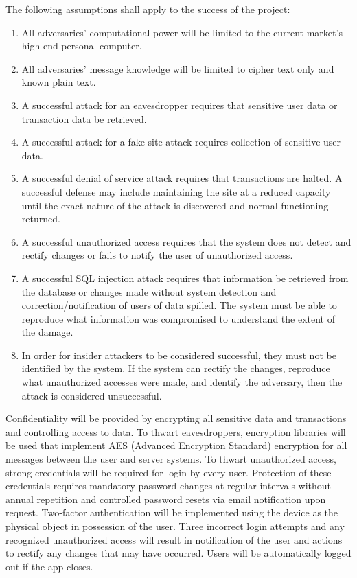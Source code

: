 \documentclass[12pt]{article}
\begin{document}
The following assumptions shall apply to the success of the project:
\begin{enumerate}
\item All adversaries' computational power will be limited to the current market's high end personal computer.
\item All adversaries' message knowledge will be limited to cipher text only and known plain text.
\item A successful attack for an eavesdropper requires that sensitive user data or transaction data be retrieved. 
\item A successful attack for a fake site attack requires collection of sensitive user data.
\item A successful denial of service attack requires that transactions are halted.  A successful defense may include maintaining the site at a reduced capacity until the exact nature of the attack is discovered and normal functioning returned.
\item A successful unauthorized access requires that the system does not detect and rectify changes or fails to notify the user of unauthorized access.
\item A successful SQL injection attack requires that information be retrieved from the database or changes made without system detection and correction/notification of users of data spilled.  The system must be able to reproduce what information was compromised to understand the extent of the damage.
\item In order for insider attackers to be considered successful, they must not be identified by the system.  If the system can rectify the changes, reproduce what unauthorized accesses were made, and identify the adversary, then the attack is considered unsuccessful. 
\end{enumerate}
 
Confidentiality will be provided by encrypting all sensitive data and transactions and controlling access to data.  To thwart eavesdroppers, encryption libraries will be used that implement AES (Advanced Encryption Standard) encryption for all messages between the user and server systems. To thwart unauthorized access, strong credentials will be required for login by every user.  Protection of these credentials requires mandatory password changes at regular intervals without annual repetition and controlled password resets via email notification upon request. Two-factor authentication will be implemented using the device as the physical object in possession of the user.  Three incorrect login attempts and any recognized unauthorized access will result in notification of the user and actions to rectify any changes that may have occurred.  Users will be automatically logged out if the app closes. \\
\end{document}
